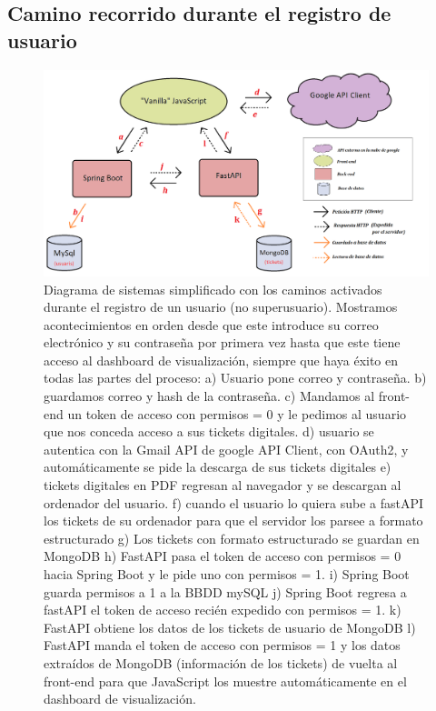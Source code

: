 \documentclass[a4paper,12pt]{report}
\begin{document}
				
			\subsection{Camino recorrido durante el registro de usuario}
				
				
				\setlength{\belowcaptionskip}{3pt}
				\FloatBarrier
				\begin{figure}[H]
					\centering
					\includegraphics[width=1\textwidth]{img/diagramaSistemesAplicacioMercappCAMIREGISTREbo.png}
					\caption{Diagrama de sistemas simplificado con los caminos activados durante el registro de un usuario (no superusuario). Mostramos acontecimientos en orden desde que este introduce su correo electrónico y su contraseña por primera vez hasta que este tiene acceso al dashboard de visualización, siempre que haya éxito en todas las partes del proceso: a) Usuario pone correo y contraseña. b) guardamos correo y hash de la contraseña. c) Mandamos al front-end un token de acceso con permisos = 0 y le pedimos al usuario que nos conceda acceso a sus tickets digitales. d) usuario se autentica con la Gmail API de google API Client, con OAuth2, y automáticamente se pide la descarga de sus tickets digitales e) tickets digitales en PDF regresan al navegador y se descargan al ordenador del usuario. f) cuando el usuario lo quiera sube a fastAPI los tickets de su ordenador para que el servidor los parsee a formato estructurado g) Los tickets con formato estructurado se guardan en MongoDB h) FastAPI pasa el token de acceso con permisos = 0 hacia Spring Boot y le pide uno con permisos = 1. i) Spring Boot guarda permisos a 1 a la BBDD mySQL j) Spring Boot regresa a fastAPI el token de acceso recién expedido con permisos = 1. k) FastAPI obtiene los datos de los tickets de usuario de MongoDB l) FastAPI manda el token de acceso con permisos = 1 y los datos extraídos de MongoDB (información de los tickets) de vuelta al front-end para que JavaScript los muestre automáticamente en el dashboard de visualización.}
					\label{fig:diagramaSistemesAplicacioMercappCAMIREGISTRE} 
				\end{figure}
				\FloatBarrier
				
\end{document}
